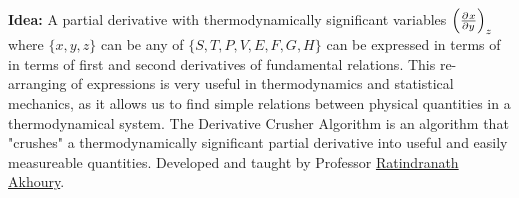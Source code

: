 \documentclass{article}
\date{Winter 2022}
\author{\EC}
\begin{document}
\maketitle
\noindent\textbf{Idea:} A partial derivative with thermodynamically significant variables $\qty(\pder{x}{y})_z$ where $\{x,y,z\}$ can be any of $\{S,T,P,V,E,F,G,H\}$ can be expressed in terms of in terms of first and second derivatives of fundamental relations. This re-arranging of expressions is very useful in thermodynamics and statistical mechanics, as it allows us to find simple relations between physical quantities in a thermodynamical system. The 
Derivative Crusher Algorithm is an algorithm that "crushes" a thermodynamically significant partial derivative into useful and easily measureable quantities. Developed and taught by Professor \hyperlink{https://lsa.umich.edu/physics/people/faculty/akhoury.html}{ Ratindranath Akhoury}.
\end{document}
